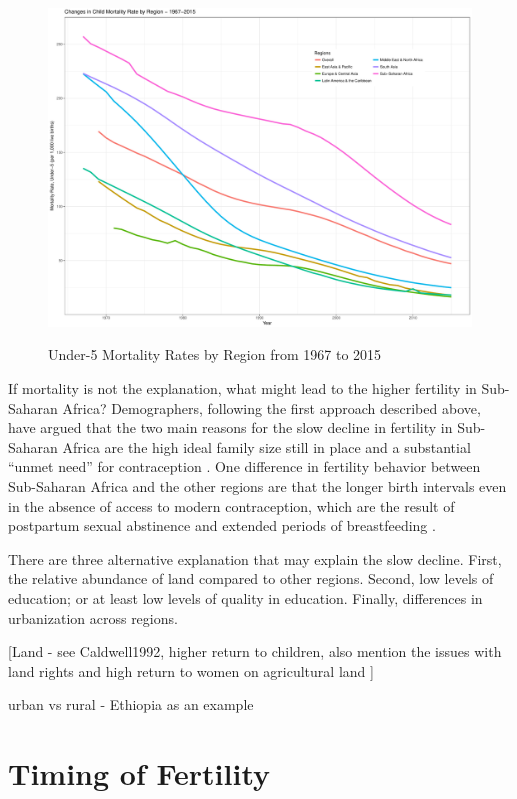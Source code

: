 \documentclass[letterpaper,12pt]{article}
\begin{document}
\begin{figure}[hp]
    \centering
    \caption{Under-5 Mortality Rates by Region from 1967 to 2015}
    \includegraphics[width=0.75\linewidth]{childMortalityRates}
    \label{fig:mortality}
\end{figure}

If mortality is not the explanation, what might lead to the
higher fertility in Sub-Saharan Africa?
Demographers, following the first approach described above, 
have argued that the two main reasons for the slow decline 
in fertility in Sub-Saharan Africa are the high ideal family 
size still in place and a substantial ``unmet need'' for contraception  
\citep{Bongaarts2013a}.
One difference in fertility behavior between Sub-Saharan Africa and
the other regions are that the longer birth intervals even in the
absence of access to modern contraception, which are the result
of postpartum sexual abstinence and extended periods of 
breastfeeding \citep{Caldwell1992}.


There are three alternative explanation that may explain the
slow decline.
First, the relative abundance of land compared to other regions.
Second, low levels of education; or at least low levels of quality
in education.
Finally, differences in urbanization across regions.  

[Land - see Caldwell1992, higher return to children,
also mention the issues with land rights \citep{Goldstein2008}
and high return to women on agricultural land \citep{jacoby95}]


    
urban vs rural - Ethiopia as an example   




    

\section{Timing of Fertility}
\end{document}
